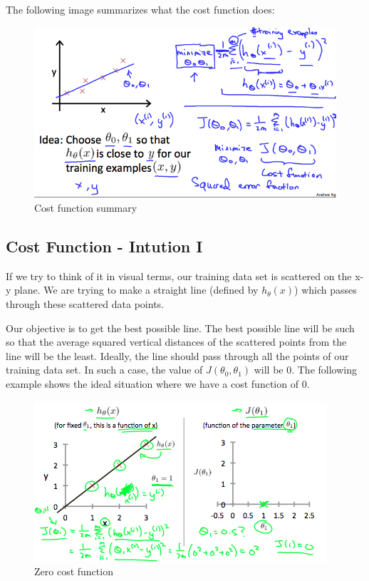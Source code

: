 \documentclass[
]{article}
\begin{document}
The following image summarizes what the cost function does:

\begin{figure}
\centering
\includegraphics{cost_function.png}
\caption{Cost function summary}
\end{figure}

\hypertarget{cost-function---intution-i}{%
\subsection{Cost Function - Intution
I}\label{cost-function---intution-i}}

If we try to think of it in visual terms, our training data set is
scattered on the x-y plane. We are trying to make a straight line
(defined by \(h_\theta(x)\)) which passes through these scattered data
points.

Our objective is to get the best possible line. The best possible line
will be such so that the average squared vertical distances of the
scattered points from the line will be the least. Ideally, the line
should pass through all the points of our training data set. In such a
case, the value of \(J(\theta_0, \theta_1)\) will be 0. The following
example shows the ideal situation where we have a cost function of 0.

\begin{figure}
\centering
\includegraphics{Zero_cost_function.png}
\caption{Zero cost function}
\end{figure}
\end{document}

